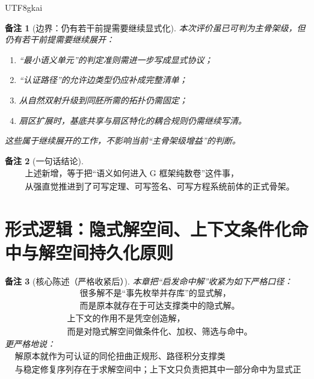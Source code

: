 \documentclass[12pt]{article}
\newtheorem{remark}{备注}[section]
\begin{document}
\begin{CJK*}{UTF8}{gkai}
\begin{remark}[边界：仍有若干前提需要继续显式化]
本次评价虽已可判为主骨架级，但仍有若干前提需要继续展开：
\begin{enumerate}
  \item “最小语义单元”的判定准则需进一步写成显式协议；
  \item “认证路径”的允许边类型仍应补成完整清单；
  \item 从自然双射升级到同胚所需的拓扑仍需固定；
  \item 扇区扩展时，基底共享与扇区特化的耦合规则仍需继续写清。
\end{enumerate}
这些属于继续展开的工作，不影响当前“主骨架级增益”的判断。
\end{remark}

\begin{remark}[一句话结论]
\[
  \boxed{
    \begin{aligned}
      &\text{上述新增，等于把“语义如何进入 G 框架纯数卷”这件事，}\\
      &\text{从强直觉推进到了可写定理、可写签名、可写方程系统前体的正式骨架。}
    \end{aligned}
  }
\]
\end{remark}

\clearpage

\section{形式逻辑：隐式解空间、上下文条件化命中与解空间持久化原则}
\label{sec:tex37-ch15}

\begin{remark}[核心陈述（严格收紧后）]
本章把“启发命中解”收紧为如下严格口径：
\[
  \boxed{
    \begin{aligned}
      &\text{很多解不是“事先枚举并存库”的显式解，}\\
      &\text{而是原本就存在于可达支撑类中的隐式解。}
    \end{aligned}
  }
\]
\[
  \boxed{
    \begin{aligned}
      &\text{上下文的作用不是凭空创造解，}\\
      &\text{而是对隐式解空间做条件化、加权、筛选与命中。}
    \end{aligned}
  }
\]
更严格地说：
\[
  \boxed{
    \begin{aligned}
      &\text{解原本就作为可认证的同伦扭曲正规形、路径积分支撑类}\\
      &\text{与稳定修复序列存在于求解空间中；上下文只负责把其中一部分命中为显式正规形。}
    \end{aligned}
  }
\]
\end{remark}


\end{CJK*}
\end{document}
